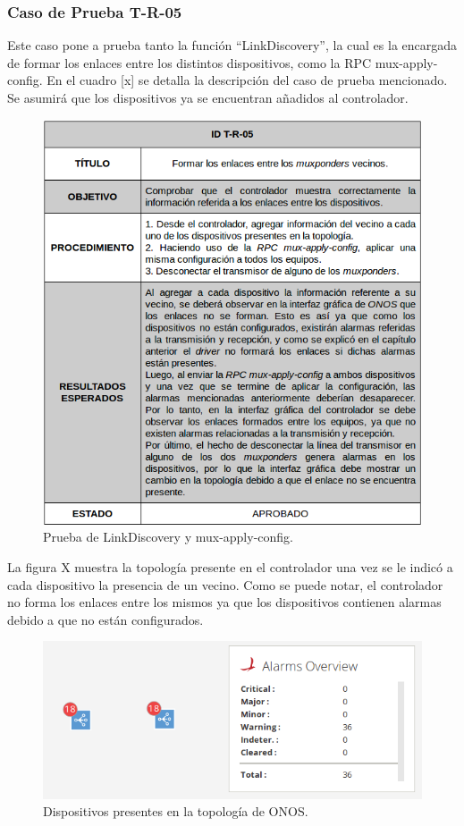   \subsubsection{Caso de Prueba T-R-05}

  Este caso pone a prueba tanto la función “LinkDiscovery”, la cual es la encargada de formar los enlaces entre los distintos dispositivos, como la RPC mux-apply-config. 
  En el cuadro [x] se detalla la descripción del caso de prueba mencionado. Se asumirá que los dispositivos ya se encuentran añadidos al controlador.
  

\begin{figure}[H]
	\centering
	\includegraphics[scale=0.6]{Figures/test5.png}
	\caption{Prueba de LinkDiscovery y mux-apply-config.}
	\label{fig:test5}
  \end{figure}

  La figura X muestra la topología presente en el controlador una vez se le indicó a cada dispositivo la presencia de un vecino. Como se puede notar, el controlador no forma los enlaces entre los mismos ya que los dispositivos contienen alarmas debido a que no están configurados. 

  \begin{figure}[H]
	\centering
	\includegraphics[scale=0.5]{Figures/test5_1.png}
	\caption{Dispositivos presentes en la topología de ONOS.}
	\label{fig:test4_consulta}
  \end{figure}

